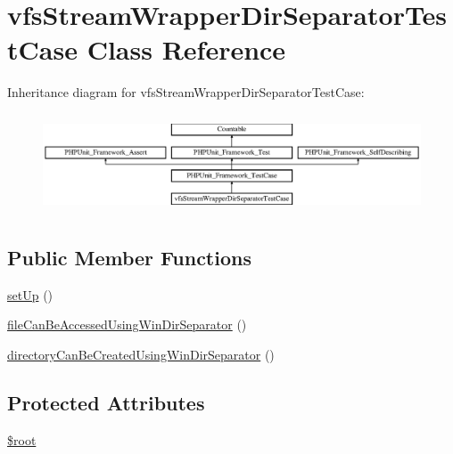 \hypertarget{classorg_1_1bovigo_1_1vfs_1_1vfs_stream_wrapper_dir_separator_test_case}{}\section{vfs\+Stream\+Wrapper\+Dir\+Separator\+Test\+Case Class Reference}
\label{classorg_1_1bovigo_1_1vfs_1_1vfs_stream_wrapper_dir_separator_test_case}
Inheritance diagram for vfs\+Stream\+Wrapper\+Dir\+Separator\+Test\+Case\+:\begin{figure}[H]
\begin{center}
\leavevmode
\includegraphics[height=2.986667cm]{classorg_1_1bovigo_1_1vfs_1_1vfs_stream_wrapper_dir_separator_test_case}
\end{center}
\end{figure}
\subsection*{Public Member Functions}
\begin{DoxyCompactItemize}
\item 
\mbox{\hyperlink{classorg_1_1bovigo_1_1vfs_1_1vfs_stream_wrapper_dir_separator_test_case_a0bc688732d2b3b162ffebaf7812e78da}{set\+Up}} ()
\item 
\mbox{\hyperlink{classorg_1_1bovigo_1_1vfs_1_1vfs_stream_wrapper_dir_separator_test_case_ab1ca3fc3b9e26c3d35bf496ab5b7ce51}{file\+Can\+Be\+Accessed\+Using\+Win\+Dir\+Separator}} ()
\item 
\mbox{\hyperlink{classorg_1_1bovigo_1_1vfs_1_1vfs_stream_wrapper_dir_separator_test_case_a3bf1c2d82c38677b6a9c2cae7ad6ae35}{directory\+Can\+Be\+Created\+Using\+Win\+Dir\+Separator}} ()
\end{DoxyCompactItemize}
\subsection*{Protected Attributes}
\begin{DoxyCompactItemize}
\item 
\mbox{\hyperlink{classorg_1_1bovigo_1_1vfs_1_1vfs_stream_wrapper_dir_separator_test_case_ab37f7c32f41c3c61ed940887453767f4}{\$root}}
\end{DoxyCompactItemize}
